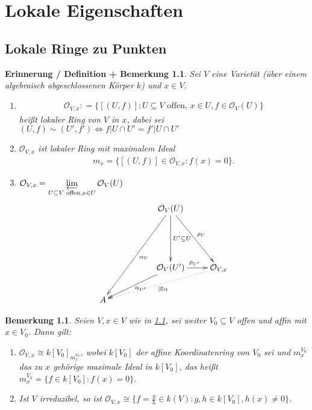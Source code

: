 \documentclass[a4paper,12pt]{report}
\theoremstyle{break}
\newtheorem{ErinnDefBem}[Def]{Erinnerung / Definition + Bemerkung}
\newtheorem{Bem}[Def]{Bemerkung}
\theoremstyle{nonumberbreak}
\theoremstyle{nonumberplain}
\newcommand{\defeqr}[0]{\mathrel{\mathop:}=}
\newcommand{\ilim}{\mathop{\varprojlim}\limits}
\begin{document}
\chapter{Lokale Eigenschaften}
\setcounter{section}{13}
\section{Lokale Ringe zu Punkten}
\begin{ErinnDefBem}
  \label{bem:14.1}
  Sei $V$ eine Varietät (über einem algebraisch abgeschlossenen Körper $k$) und $x\in V$.
  \begin{enumerate}
  \item
    \begin{align*}
      \mathcal{O}_{V,x}\defeqr\{[(U,f)]:U\subseteq V \text{ offen, } x\in U, f\in\mathcal{O}_V(U)\}
    \end{align*}
    heißt lokaler Ring von $V$ in $x$, dabei sei $(U,f)\sim (U',f')\Leftrightarrow f\vert U\cap U'=f'\vert U\cap U'$
  \item $\mathcal{O}_{V,x}$ ist lokaler Ring mit maximalem Ideal
    \begin{align*}
      m_x=\{[(U,f)]\in\mathcal{O}_{V,x}:f(x)=0\}.
    \end{align*}
  \item $\mathcal{O}_{V,x}=\ilim_{U\subseteq V \text{ offen},x\in U}\mathcal{O}_V(U)$ \\
    \begin{align*}
    \begin{xy}
      \xymatrix{
        & & \mathcal{O}_V(U)\ar[3,-2]^{\alpha_U}\ar[2,1]^{\rho_U}\ar[2,0]^{U'\subseteq U} & \\
        & & & \\
        & & \mathcal{O}_V(U')\ar[r]^{\rho_{U'}}\ar[1,-2]^{\alpha_{U'}} & \mathcal{O}_{V,x}\ar@{.>}[1,-3]^{\exists! \alpha} \\
        A & & & \\
      }
    \end{xy}
    \end{align*}
  \end{enumerate}
\end{ErinnDefBem}
\begin{Bem}
  \label{bem:14.2}
  Seien $V,x\in V$ wie in \ref{bem:14.1}, sei weiter $V_0\subseteq V$ offen und affin mit $x\in V_0$. Dann gilt: 
  \begin{enumerate}
  \item $\mathcal{O}_{V,x}\cong k[V_0]_{m_x^{V_0}}$, wobei $k[V_0]$ der affine Koordinatenring von $V_0$
    sei und $m_x^{V_0}$ das zu $x$ gehörige maximale Ideal in $k[V_0]$, das heißt $m_x^{V_0}=\{f\in k[V_0]:f(x)=0\}$.
  \item Ist $V$ irreduzibel, so ist $\mathcal{O}_{V,x}\cong \{f=\frac{g}{h}\in k(V):g,h\in k[V_0], h(x)\neq 0\}$.
  \end{enumerate}
\end{Bem}
\end{document}
